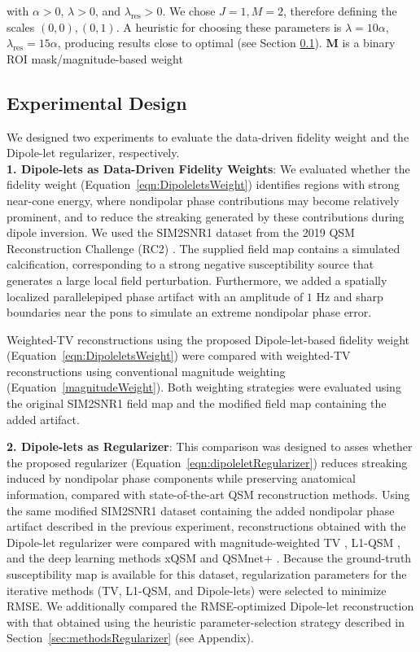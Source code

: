 \documentclass{article}
\begin{document}
\noindent
with $\alpha>0$, $\lambda>0$, and $\lambda_{\text{res}}>0$. We chose $J=1,M=2$, therefore defining the scales $(0,0), (0,1)$. A heuristic for choosing these parameters is $\lambda = 10\alpha$, $\lambda_{\text{res}}=15\alpha$, producing results close to optimal (see Section \ref{sec:methodsSIM2}). $\mathbf{M}$ is a binary ROI mask/magnitude-based weight


\subsection{Experimental Design}
\label{sec:methodsSIM2}

We designed two experiments to evaluate the data-driven fidelity weight and the Dipole-let regularizer, respectively.\\

\textbf{1. Dipole-lets as Data-Driven Fidelity Weights}: We evaluated whether the fidelity weight (Equation~\eqref{eqn:DipoleletsWeight}) identifies regions with strong near-cone energy, where nondipolar phase contributions may become relatively prominent, and to reduce the streaking generated by these contributions during dipole inversion. We used the SIM2SNR1 dataset from the 2019 QSM Reconstruction Challenge (RC2) \cite{marques2005application,qsm2021qsm}. The supplied field map contains a simulated calcification, corresponding to a strong negative susceptibility source that generates a large local field perturbation. Furthermore, we added a spatially localized parallelepiped phase artifact with an amplitude of $1$ Hz and sharp boundaries near the pons to simulate an extreme nondipolar phase error.

Weighted-TV reconstructions using the proposed Dipole-let-based fidelity weight (Equation~\eqref{eqn:DipoleletsWeight}) were compared with weighted-TV reconstructions using conventional magnitude weighting (Equation~\eqref{magnitudeWeight}). Both weighting strategies were evaluated using the original SIM2SNR1 field map and the modified field map containing the added artifact. 

\textbf{2. Dipole-lets as Regularizer}: This comparison was designed to asses whether the proposed regularizer (Equation~\eqref{eqn:dipoleletRegularizer}) reduces streaking induced by nondipolar phase components while preserving anatomical information, compared with state-of-the-art QSM reconstruction methods. Using the same modified SIM2SNR1 dataset containing the added nondipolar phase artifact described in the previous experiment, reconstructions obtained with the Dipole-let regularizer were compared with magnitude-weighted TV \cite{milovic2018fast}, L1-QSM \cite{milovic2022streaking}, and the deep learning methods xQSM \cite{gao2021xqsm} and QSMnet+ \cite{jung2020exploring}. Because the ground-truth susceptibility map is available for this dataset, regularization parameters for the iterative methods (TV, L1-QSM, and Dipole-lets) were selected to minimize RMSE. We additionally compared the RMSE-optimized Dipole-let reconstruction with that obtained using the heuristic parameter-selection strategy described in Section~\ref{sec:methodsRegularizer} (see Appendix).
\end{document}
